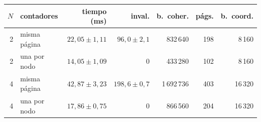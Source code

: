 \begin{tabular}{@{}rlrrrrr@{}}
\toprule
$N$ & contadores & tiempo (ms) & inval. & b.\ coher. & págs. & b.\ coord. \\
\midrule
2 & misma página & $22,05 \pm 1,11$ & $96,0 \pm 2,1$ & 832\,640 & 198 & 8\,160 \\
2 & una por nodo & $14,05 \pm 1,09$ & 0 & 433\,280 & 102 & 8\,160 \\
4 & misma página & $42,87 \pm 3,23$ & $198,6 \pm 0,7$ & 1\,692\,736 & 403 & 16\,320 \\
4 & una por nodo & $17,86 \pm 0,75$ & 0 & 866\,560 & 204 & 16\,320 \\
\bottomrule
\end{tabular}
